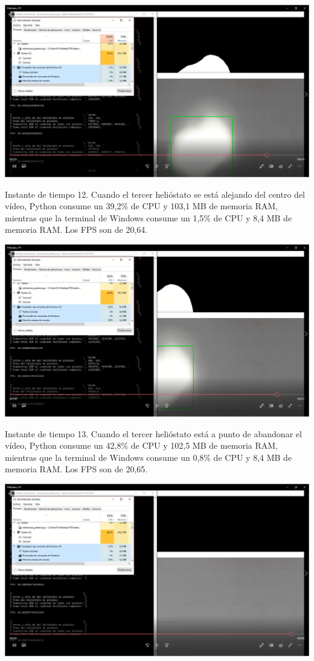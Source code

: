 \documentclass[12pt]{article}
\begin{document}
\includegraphics[width=\textwidth]{CapturasRendimientoSoftware2/Imagen12.png}

Instante de tiempo 12. Cuando el tercer helióstato se está alejando del centro del vídeo, Python consume un 39,2\% de CPU y 103,1 MB de memoria RAM, mientras que la terminal de Windows consume un 1,5\% de CPU y 8,4 MB de memoria RAM. Los FPS son de 20,64.


\includegraphics[width=\textwidth]{CapturasRendimientoSoftware2/Imagen13.png}

Instante de tiempo 13. Cuando el tercer helióstato está a punto de abandonar el vídeo, Python consume un 42,8\% de CPU y 102,5 MB de memoria RAM, mientras que la terminal de Windows consume un 0,8\% de CPU y 8,4 MB de memoria RAM. Los FPS son de 20,65.


\includegraphics[width=\textwidth]{CapturasRendimientoSoftware2/Imagen14.png}
\end{document}
